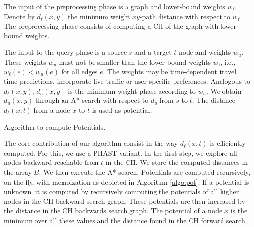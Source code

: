 \documentclass[a4paper,UKenglish,cleveref, autoref]{lipics-v2019}
\begin{document}
The input of the preprocessing phase is a graph and lower-bound weights $w_{\ell}$.
Denote by $d_{\ell}(x,y)$ the minimum weight $xy$-path distance with respect to $w_{\ell}$.
The preprocessing phase consists of computing a CH of the graph with lower-bound weights.

The input to the query phase is a source $s$ and a target $t$ node and weights $w_u$.
These weights $w_u$ must not be smaller than the lower-bound weights $w_{\ell}$, i.e., $w_{\ell}(e) < w_u(e)$ for all edges $e$.
The weights may be time-dependent travel time predictions, incorporate live traffic or user specific preferences.
Analogous to $d_{\ell}(x,y)$, $d_u(x,y)$ is the minimum-weight phase according to $w_u$.
We obtain $d_u(x,y)$ through an A* search with respect to $d_u$ from $s$ to $t$.
The distance $d_{\ell}(x,t)$ from a node $x$ to $t$ is used as potential.

\begin{algorithm2e}

\caption{Algorithm to compute Potentials.}
\label{algo:pot}

\end{algorithm2e}

The core contribution of our algorithm consist in the way $d_{\ell}(x,t)$ is efficiently computed.
For this, we use a PHAST variant.
In the first step, we explore all nodes backward-reachable from $t$ in the CH.
We store the computed distances in the array $B$.
We then execute the A* search.
Potentials are computed recursively, on-the-fly, with memoization as depicted in Algorithm \ref{algo:pot}.
If a potential is unknown, it is computed by recursively computing the potentials of all higher nodes in the CH backward search graph.
These potentials are then increased by the distance in the CH backwards search graph.
The potential of a node $x$ is the minimum over all these values and the distance found in the CH forward search.

\end{document}

